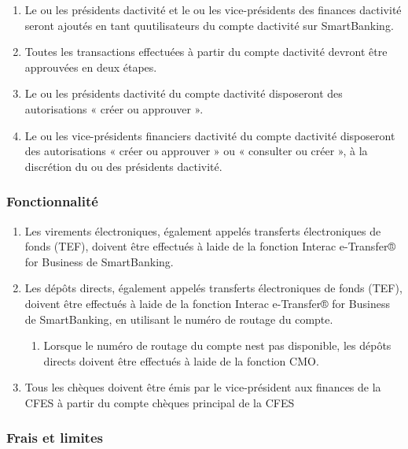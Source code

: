 \begin{enumerate}
 \item
  Le ou les présidents d\textquotesingle activité et le ou les vice-présidents des finances d\textquotesingle activité seront ajoutés en tant qu\textquotesingle utilisateurs du compte d\textquotesingle activité sur SmartBanking.
 \item
  Toutes les transactions effectuées à partir du compte d\textquotesingle activité devront être approuvées en deux étapes.
 \item
  Le ou les présidents d\textquotesingle activité du compte d\textquotesingle activité disposeront des autorisations « créer ou approuver ».
 \item
  Le ou les vice-présidents financiers d\textquotesingle activité du compte d\textquotesingle activité disposeront des autorisations « créer ou approuver » ou « consulter ou créer », à la discrétion du ou des présidents d\textquotesingle activité.
\end{enumerate}

\subsubsection{Fonctionnalité}
\label{fonctionnalite}

\begin{enumerate}
 \item
  Les virements électroniques, également appelés transferts électroniques de fonds (TEF), doivent être effectués à l\textquotesingle aide de la fonction Interac e-Transfer® for Business de SmartBanking.
 \item
  Les dépôts directs, également appelés transferts électroniques de fonds (TEF), doivent être effectués à l\textquotesingle aide de la fonction Interac e-Transfer® for Business de SmartBanking, en utilisant le numéro de routage du compte.

  \begin{enumerate}
   \item
    Lorsque le numéro de routage du compte n\textquotesingle est pas disponible, les dépôts directs doivent être effectués à l\textquotesingle aide de la fonction CMO.
  \end{enumerate}
 \item
  Tous les chèques doivent être émis par le vice-président aux finances de la CFES à partir du compte chèques principal de la CFES
\end{enumerate}

\subsubsection{Frais et limites}
\label{frais-et-limites}

